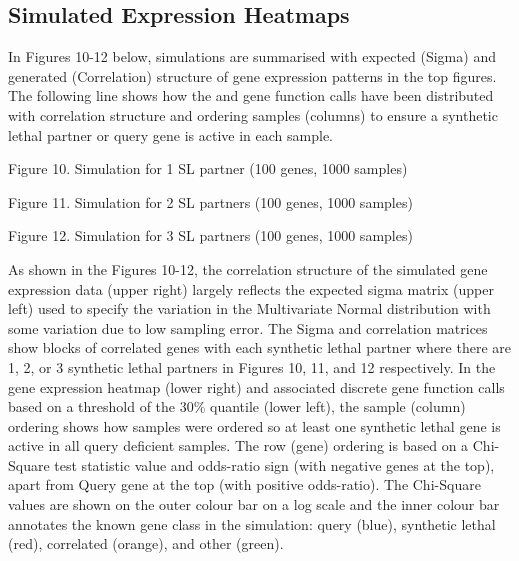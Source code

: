 \subsection{Simulated Expression Heatmaps}

In Figures 10-12 below, simulations are summarised with expected (Sigma) and generated (Correlation) structure of \gls{gene expression} patterns in the top figures.  The following line shows how the  and gene function calls have been distributed with correlation structure and ordering samples (columns) to ensure a \gls{synthetic lethal} partner or query gene is active in each sample.

Figure 10.  Simulation for 1 SL partner (100 genes, 1000 samples)

Figure 11.  Simulation for 2 SL partners (100 genes, 1000 samples)

Figure 12.  Simulation for 3 SL partners (100 genes, 1000 samples)

As shown in the Figures 10-12, the correlation structure of the simulated \gls{gene expression} data (upper right) largely reflects the expected sigma matrix (upper left) used to specify the variation in the Multivariate Normal distribution with some variation due to low sampling error.  The Sigma and correlation matrices show blocks of correlated genes with each \gls{synthetic lethal} partner where there are 1, 2, or 3 \gls{synthetic lethal} partners in Figures 10, 11, and 12 respectively.  In the \gls{gene expression} heatmap (lower right) and associated discrete gene function calls based on a threshold of the 30\% quantile (lower left), the sample (column) ordering shows how samples were ordered so at least one \gls{synthetic lethal} gene is active in all query deficient samples.  The row (gene) ordering is based on a Chi-Square test statistic value and odds-ratio sign (with negative genes at the top), apart from Query gene at the top (with positive odds-ratio).  The Chi-Square values are shown on the outer colour bar on a log scale and the inner colour bar annotates the known gene class in the simulation: query (blue), \gls{synthetic lethal} (red), correlated (orange), and other (green).

